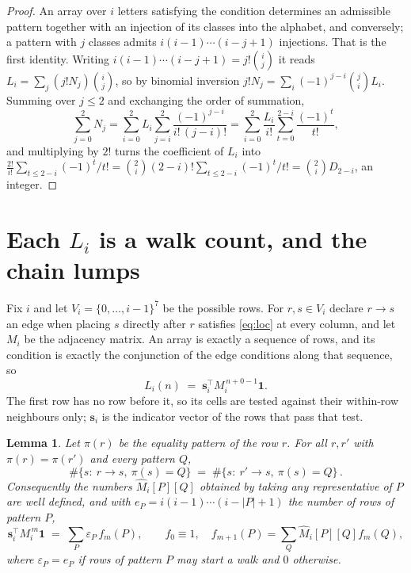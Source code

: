 \documentclass[11pt,a4paper]{article}
\theoremstyle{plain}
\newtheorem{lemma}[theorem]{Lemma}
\theoremstyle{definition}
\begin{document}
\begin{proof}
An array over $i$ letters satisfying the condition determines an admissible pattern together
with an injection of its classes into the alphabet, and conversely; a pattern with $j$
classes admits $i(i-1)\cdots(i-j+1)$ injections. That is the first identity. Writing
$i(i-1)\cdots(i-j+1)=j!\binom{i}{j}$ it reads $L_i=\sum_j (j!N_j)\binom{i}{j}$, so by
binomial inversion $j!N_j=\sum_{i}(-1)^{j-i}\binom{j}{i}L_i$. Summing over
$j\le 2$ and exchanging the order of summation,
\[
\sum_{j=0}^{2}N_j=\sum_{i=0}^{2}L_i\sum_{j=i}^{2}\frac{(-1)^{j-i}}{i!\,(j-i)!}
=\sum_{i=0}^{2}\frac{L_i}{i!}\sum_{t=0}^{2-i}\frac{(-1)^t}{t!} ,
\]
and multiplying by $2!$ turns the coefficient of $L_i$ into
$\frac{2!}{i!}\sum_{t\le 2-i}(-1)^t/t!=\binom{2}{i}(2-i)!\sum_{t\le 2-i}(-1)^t/t!
=\binom{2}{i}D_{2-i}$, an integer.
\end{proof}

\section{Each $L_i$ is a walk count, and the chain lumps}

Fix $i$ and let $V_i=\{0,\dots,i-1\}^{7}$ be the possible rows. For $r,s\in V_i$
declare $r\to s$ an edge when placing $s$ directly after $r$ satisfies \eqref{eq:loc} at
every column, and let $M_i$ be the adjacency matrix. An array is exactly a sequence of
rows, and its condition is exactly the conjunction of the edge conditions along that
sequence, so
\[
L_i(n)\;=\;\mathbf{s}_i^{\!\top}M_i^{\,n+0-1}\mathbf{1} .
\]
The first row has no row before it, so its cells are tested
against their within-row neighbours only; $\mathbf{s}_i$ is the indicator vector of the
rows that pass that test.

\begin{lemma}\label{lem:lump}
Let $\pi(r)$ be the equality pattern of the row $r$. For all $r,r'$ with
$\pi(r)=\pi(r')$ and every pattern $Q$,
\[
\#\{s:\ r\to s,\ \pi(s)=Q\}\;=\;\#\{s:\ r'\to s,\ \pi(s)=Q\}\, .
\]
Consequently the numbers $\widehat M_i[P][Q]$ obtained by taking any representative of $P$
are well defined, and with $e_P=i(i-1)\cdots(i-|P|+1)$ the number of rows of pattern $P$,
\[
\mathbf{s}_i^{\!\top}M_i^{\,m}\mathbf{1}\;=\;\sum_P \varepsilon_P\,f_m(P),
\qquad f_0\equiv1,\quad f_{m+1}(P)=\sum_Q\widehat M_i[P][Q]f_m(Q),
\]
where $\varepsilon_P=e_P$ if rows of pattern $P$ may start a walk and $0$ otherwise.
\end{lemma}
\end{document}
